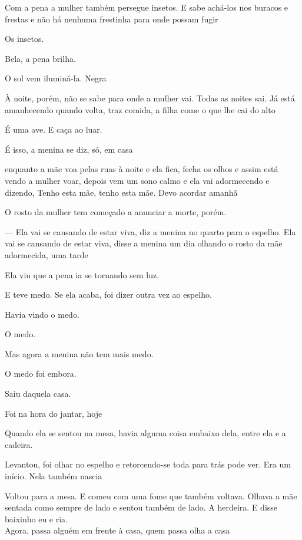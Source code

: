 Com a pena a mulher também persegue insetos. E sabe achá-los nos buracos
e frestas e não há nenhuma frestinha para onde possam fugir

Os insetos.

Bela, a pena brilha.

O sol vem iluminá-la. Negra

À noite, porém, não se sabe para onde a mulher vai. Todas as noites sai.
Já está amanhecendo quando volta, traz comida, a filha come o que lhe
cai do alto

É uma ave. E caça ao luar.

É isso, a menina se diz, só, em casa

enquanto a mãe voa pelas ruas à noite e ela fica, fecha os olhos e assim
está vendo a mulher voar, depois vem um sono calmo e ela vai adormecendo
e dizendo, Tenho esta mãe, tenho esta mãe. Devo acordar amanhã

O rosto da mulher tem começado a anunciar a morte, porém.

--- Ela vai se cansando de estar viva, diz a menina no quarto para o
espelho. Ela vai se cansando de estar viva, disse a menina um dia
olhando o rosto da mãe adormecida, uma tarde

Ela viu que a pena ia se tornando sem luz.

E teve medo. Se ela acaba, foi dizer outra vez ao espelho.

Havia vindo o medo.

O medo.

Mas agora a menina não tem mais medo.

O medo foi embora.

Saiu daquela casa.

Foi na hora do jantar, hoje

Quando ela se sentou na mesa, havia alguma coisa embaixo dela, entre ela
e a cadeira.

Levantou, foi olhar no espelho e retorcendo-se toda para trás pode ver.
Era um início. Nela também nascia

Voltou para a mesa. E comeu com uma fome que também voltava. Olhava a
mãe sentada como sempre de lado e sentou também de lado. A herdeira. E
disse baixinho eu e ria.\\

Agora, passa alguém em frente à casa, quem passa olha a casa

\pagebreak

\vspace*{4cm}

